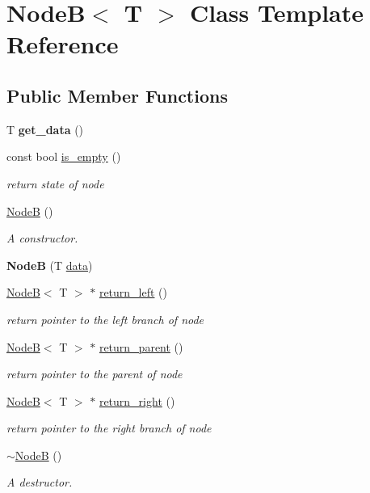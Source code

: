\hypertarget{class_node_b}{}\section{Node\+B$<$ T $>$ Class Template Reference}
\label{class_node_b}
\subsection*{Public Member Functions}
\begin{DoxyCompactItemize}
\item 
\hypertarget{class_node_b_ae5540d7200ba2dc49617abb2cfd710b4}{}T {\bfseries get\+\_\+data} ()\label{class_node_b_ae5540d7200ba2dc49617abb2cfd710b4}

\item 
const bool \hyperlink{class_node_b_a08d7227797bed893b5124da7d222154c}{is\+\_\+empty} ()
\begin{DoxyCompactList}\small\item\em return state of node \end{DoxyCompactList}\item 
\hyperlink{class_node_b_a5ef89d0aa079d6d7661eb9eeefd8ad2d}{Node\+B} ()
\begin{DoxyCompactList}\small\item\em A constructor. \end{DoxyCompactList}\item 
\hypertarget{class_node_b_ab791d657a0e5db5eccd1715b24bdbeff}{}{\bfseries Node\+B} (T \hyperlink{class_node_b_a9ce10550e81de48553bf37679a491ef5}{data})\label{class_node_b_ab791d657a0e5db5eccd1715b24bdbeff}

\item 
\hyperlink{class_node_b}{Node\+B}$<$ T $>$ $\ast$ \hyperlink{class_node_b_a42c20008f8d375b5386bb050b4330882}{return\+\_\+left} ()
\begin{DoxyCompactList}\small\item\em return pointer to the left branch of node \end{DoxyCompactList}\item 
\hyperlink{class_node_b}{Node\+B}$<$ T $>$ $\ast$ \hyperlink{class_node_b_a2e720fb5a79c8171e09d647f06de51f6}{return\+\_\+parent} ()
\begin{DoxyCompactList}\small\item\em return pointer to the parent of node \end{DoxyCompactList}\item 
\hyperlink{class_node_b}{Node\+B}$<$ T $>$ $\ast$ \hyperlink{class_node_b_a2fc22bbaf6b604dd5ad4ab60b26b35d5}{return\+\_\+right} ()
\begin{DoxyCompactList}\small\item\em return pointer to the right branch of node \end{DoxyCompactList}\item 
\hyperlink{class_node_b_a4c3fbc5d2fc1c386e71067a7db7bb84c}{$\sim$\+Node\+B} ()
\begin{DoxyCompactList}\small\item\em A destructor. \end{DoxyCompactList}\end{DoxyCompactItemize}
